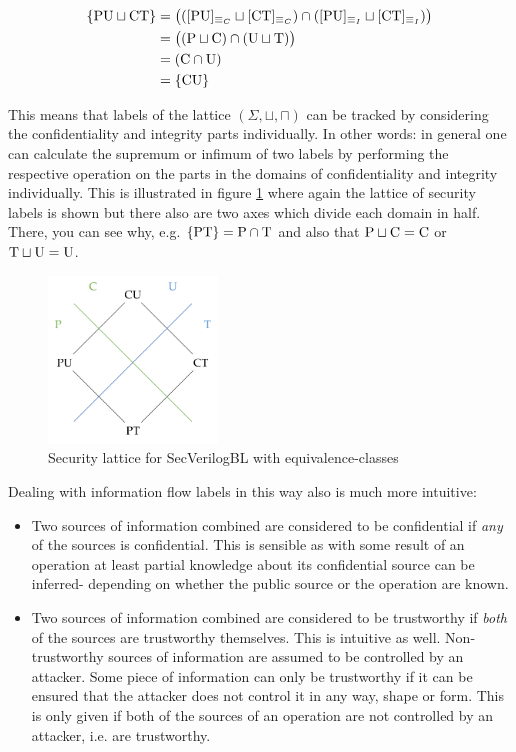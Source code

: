\begin{example}
    \begin{align*}
        \{ \text{PU} \sqcup \text{CT} \} &= \big(([\text{PU}]_{\equiv_C} \sqcup [\text{CT}]_{\equiv_C}) \cap ([\text{PU}]_{\equiv_I} \sqcup [\text{CT}]_{\equiv_I}) \big) \\
        &= \big((\text{P} \sqcup \text{C}) \cap (\text{U} \sqcup \text{T}) \big) \\
        &= (\text{C} \cap \text{U}) \\
        &= \{ \text{CU} \}
    \end{align*}
\end{example}

This means that labels of the lattice $ (\Sigma, \sqcup, \sqcap) $ can be tracked by considering the confidentiality and integrity parts individually.
In other words: in general one can calculate the supremum or infimum of two labels by performing the respective operation on the parts in the domains of confidentiality and integrity individually.
This is illustrated in figure \ref{fig:lattice-equiv-classes} where again the lattice of security labels is shown but there also are two axes which divide each domain in half.
There, you can see why, e.g. $ \{ \text{PT} \} = \text{P} \cap \text{T} $ and also that $ \text{P} \sqcup \text{C} = \text{C} $ or $ \text{T} \sqcup \text{U} = \text{U} $.

\begin{figure}
    \centering
    \includegraphics[width=0.4\textwidth]{figures/equivalence-class-lattice.png}
    \caption{Security lattice for SecVerilogBL \cite{Ferraiuolo17} with equivalence-classes}
    \label{fig:lattice-equiv-classes}
\end{figure}

Dealing with information flow labels in this way also is much more intuitive:
\begin{itemize}
    \item Two sources of information combined are considered to be confidential if \textit{any} of the sources is confidential.
    This is sensible as with some result of an operation at least partial knowledge about its confidential source can be inferred- depending on whether the public source or the operation are known.
    \item Two sources of information combined are considered to be trustworthy if \textit{both} of the sources are trustworthy themselves.
    This is intuitive as well.
    Non-trustworthy sources of information are assumed to be controlled by an attacker.
    Some piece of information can only be trustworthy if it can be ensured that the attacker does not control it in any way, shape or form.
    This is only given if both of the sources of an operation are not controlled by an attacker, i.e. are trustworthy.
\end{itemize}

